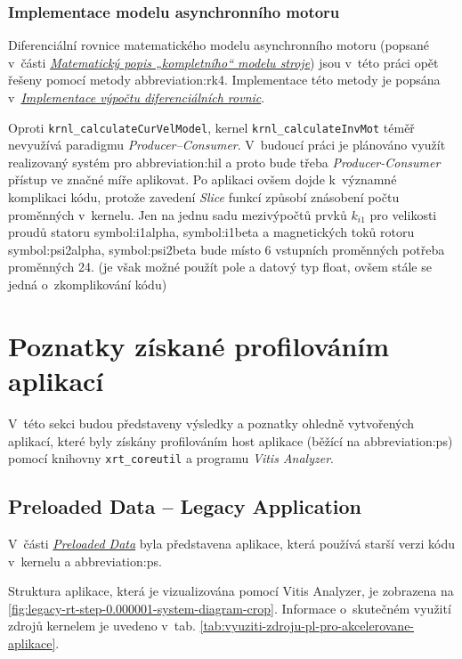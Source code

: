 \documentclass[a4paper, twoside, 11pt]{article}
\newcommand{\fbar}{\FloatBarrier}
\begin{document}
		\subsubsection{Implementace modelu asynchronního motoru}
			Diferenciální rovnice matematického modelu asynchronního motoru (popsané v~části \hyperref[subsec:matematicky-popis-kompletniho-modelu-stroje]{\textit{Matematický popis „kompletního“ modelu stroje}}) jsou v~této práci opět řešeny pomocí metody \gls{abbreviation:rk4}. Implementace této metody je popsána v~\hyperref[subsubsec:implementace-vypoctu-diferencialnich-rovnic]{\textit{Implementace výpočtu diferenciálních rovnic}}.\par
			Oproti \texttt{krnl\_calculateCurVelModel}, kernel \texttt{krnl\_calculateInvMot} téměř nevyužívá paradigmu \textit{Producer–Consumer}. V~budoucí práci je plánováno využít realizovaný systém pro \gls{abbreviation:hil} a proto bude třeba \textit{Producer-Consumer} přístup ve značné míře aplikovat. Po aplikaci ovšem dojde k~významné komplikaci kódu, protože zavedení \textit{Slice} funkcí způsobí znásobení počtu proměnných v~kernelu. Jen na jednu sadu mezivýpočtů prvků $k_{i1}$ pro velikosti proudů statoru \gls{symbol:i1alpha}, \gls{symbol:i1beta} a magnetických toků rotoru \gls{symbol:psi2alpha}, \gls{symbol:psi2beta} bude místo 6 vstupních proměnných potřeba proměnných 24. (je však možné použít pole a datový typ float, ovšem stále se jedná o~zkomplikování kódu)\par



	
	\fbar
\section{Poznatky získané profilováním aplikací}\label{sec:poznatky-ziskane-profilovanim-aplikaci}
V~této sekci budou představeny výsledky a poznatky ohledně vytvořených aplikací, které byly získány profilováním host aplikace (běžící na \gls{abbreviation:ps}) pomocí knihovny \texttt{xrt\_coreutil} a programu \textit{Vitis Analyzer}.\par

	\subsection{Preloaded Data – Legacy Application}\label{subsec:poznatky-ziskane-profilovanim-aplikaci-preloaded-data-legacy-application}
		V~části \hyperref[subsec:preloaded-data]{\textit{Preloaded Data}} byla představena aplikace, která používá starší verzi kódu v~kernelu a \gls{abbreviation:ps}.\par
		Struktura aplikace, která je vizualizována pomocí Vitis Analyzer, je zobrazena na \ref{fig:legacy-rt-step-0.000001-system-diagram-crop}. Informace o~skutečném využití zdrojů kernelem je uvedeno v~tab. \ref{tab:vyuziti-zdroju-pl-pro-akcelerovane-aplikace}.\par
\end{document}
